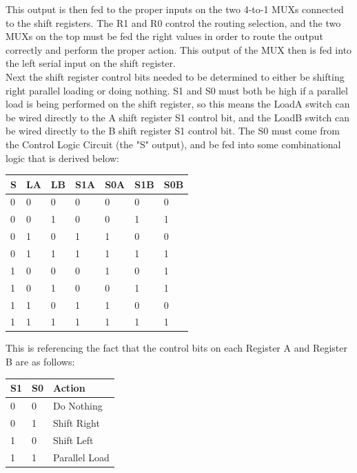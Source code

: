 \documentclass[journal, twocolumn, final,11pt,letterpaper]{IEEEtran}
\begin{document}
This output is then fed to the proper inputs on the two 4-to-1 MUXs connected to the shift registers. The R1 and R0 control the routing selection, and the two MUXs on the top must be fed the right values in order to route the output correctly and perform the proper action. This output of the MUX then is fed into the left serial input on the shift register. \\

Next the shift register control bits needed to be determined to either be shifting right parallel loading or doing nothing. S1 and S0 must both be high if a parallel load is being performed on the shift register, so this means the LoadA switch can be wired directly to the A shift register S1 control bit, and the LoadB switch can be wired directly to the B shift register S1 control bit. The S0 must come from the Control Logic Circuit (the "S" output), and be fed into some combinational logic that is derived below:

\begin{center}
	\begin{tabular}{lll|ll|ll}
		S & LA & LB & S1A & S0A & S1B & S0B\\ \hline
		0 & 0 & 0 & 0 & 0 & 0 & 0 \\
		0 & 0 & 1 & 0 & 0 & 1 & 1 \\
		0 & 1 & 0 & 1 & 1 & 0 & 0 \\
		0 & 1 & 1 & 1 & 1 & 1 & 1 \\
		1 & 0 & 0 & 0 & 1 & 0 & 1 \\
		1 & 0 & 1 & 0 & 0 & 1 & 1 \\
		1 & 1 & 0 & 1 & 1 & 0 & 0 \\
		1 & 1 & 1 & 1 & 1 & 1 & 1 \\
	\end{tabular}
\end{center}

This is referencing the fact that the control bits on each Register A and Register B are as follows: 

\begin{center}
	\begin{tabular}{ll|l}
		S1 & S0 & Action \\ \hline
		0 & 0 & Do Nothing  \\
		0 & 1 & Shift Right \\
		1 & 0 & Shift Left \\
		1 & 1 & Parallel Load\\
	\end{tabular}
\end{center}
\end{document}
